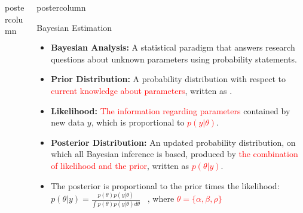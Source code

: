\documentclass[final]{beamer}\usepackage[]{graphicx}\usepackage[]{color}
\newcommand{\red}{\textcolor{red}}
\newlength{\columnheight}\setlength{\columnheight}{75cm} %
\begin{document}
{\begin{frame}
\begin{columns}
\begin{column}{.33\textwidth}
\begin{beamercolorbox}[center,wd=\textwidth]{postercolumn}
\begin{minipage}[T]{.97\textwidth}
{}
\end{minipage}
\end{beamercolorbox}
\end{column}
\begin{column}{.33\textwidth}
\begin{beamercolorbox}[center,wd=\textwidth]{postercolumn}
\begin{minipage}[T]{.97\textwidth} %
\parbox[t][\columnheight]{\textwidth}{ %



\begin{block}{Bayesian Estimation}

 	\begin{itemize}
		\item \textbf{Bayesian Analysis:} A statistical paradigm that answers research questions about unknown parameters using probability statements.
		\vspace{0.4cm}
		\item \textbf{Prior Distribution:} A probability distribution with respect to \red{current knowledge about parameters}, written as \boldmath{\red{$p(\theta)$}}.
		\vspace{0.4cm}
		\item \textbf{Likelihood:} \red{The information regarding parameters} contained by new data $y$, which is proportional to \red{$p(y|\theta)$}. 
		\vspace{0.4cm}
		\item \textbf{Posterior Distribution:} An updated probability distribution, on which all Bayesian inference is based, produced by \red{the combination of likelihood and the prior}, written as \red{$p(\theta|y)$}.
		\vspace{0.4cm}
		\item The posterior is proportional to the prior times the likelihood:\\ 
		\vspace{0.4cm}
		$\displaystyle{p(\theta|y)=\frac{p(\theta)p(y|\theta)}{\int p(\theta)p(y|\theta)d\theta}}$
		\ , where \red{$\theta = \{\alpha, \beta, \rho\}$}
	\end{itemize}



\end{block}}
\end{minipage}
\end{beamercolorbox}
\end{column}
\end{columns}
\end{frame}}
\end{document}

